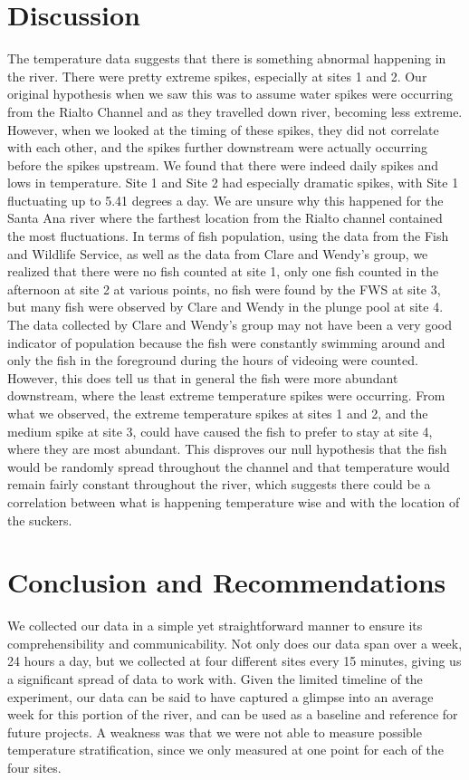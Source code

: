 \documentclass{article}
\begin{document}
\section{Discussion}

The temperature data suggests that there is something abnormal happening in the river. There were pretty extreme spikes, especially at sites 1 and 2. Our original hypothesis when we saw this was to assume water spikes were occurring from the Rialto Channel and as they travelled down river, becoming less extreme. However, when we looked at the timing of these spikes, they did not correlate with each other, and the spikes further downstream were actually occurring before the spikes upstream. We found that there were indeed daily spikes and lows in temperature. Site 1 and Site 2 had especially dramatic spikes, with Site 1 fluctuating up to 5.41 degrees a day. We are unsure why this happened for the Santa Ana river where the farthest location from the Rialto channel contained the most fluctuations. In terms of fish population, using the data from the Fish and Wildlife Service, as well as the data from Clare and Wendy's group, we realized that there were no fish counted at site 1, only one fish counted in the afternoon at site 2 at various points, no fish were found by the FWS at site 3, but many fish were observed by Clare and Wendy in the plunge pool at site 4. The data collected by Clare and Wendy’s group may not have been a very good indicator of population because the fish were constantly swimming around and only the fish in the foreground during the hours of videoing were counted. However, this does tell us that in general the fish were more abundant downstream, where the least extreme temperature spikes were occurring. From what we observed, the extreme temperature spikes at sites 1 and 2, and the medium spike at site 3, could have caused the fish to prefer to stay at site 4, where they are most abundant. This disproves our null hypothesis that the fish would be randomly spread throughout the channel and that temperature would remain fairly constant throughout the river, which suggests there could be a correlation between what is happening temperature wise and with the location of the suckers.

\section{Conclusion and Recommendations}

We collected our data in a simple yet straightforward manner to ensure its comprehensibility and communicability. Not only does our data span over a week, 24 hours a day, but we collected at four different sites every 15 minutes, giving us a significant spread of data to work with. Given the limited timeline of the experiment, our data can be said to have captured a glimpse into an average week for this portion of the river, and can be used as a baseline and reference for future projects. A weakness was that we were not able to measure possible temperature stratification, since we only measured at one point for each of the four sites. 
\end{document}
